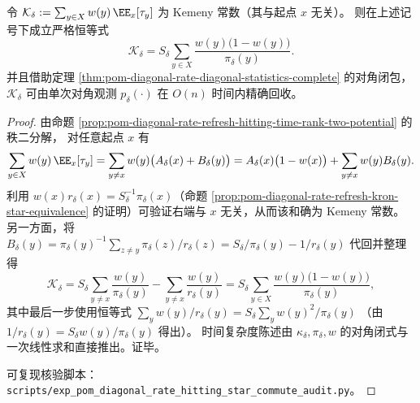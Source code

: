 \begin{theorem}\label{thm:pom-diagonal-rate-refresh-kemeny-star-closed}
令
\(
\mathcal K_\delta:=\sum_{y\in X}w(y)\,\EE_x[\tau_y]
\)
为 Kemeny 常数（其与起点 \(x\) 无关）。
则在上述记号下成立严格恒等式
\[
\mathcal K_\delta
=S_\delta\sum_{y\in X}\frac{w(y)\bigl(1-w(y)\bigr)}{\pi_\delta(y)}.
\]
并且借助定理 \ref{thm:pom-diagonal-rate-diagonal-statistics-complete} 的对角闭包，\(\mathcal K_\delta\) 可由单次对角观测 \(p_\delta(\cdot)\) 在 \(O(n)\) 时间内精确回收。
\end{theorem}
\begin{proof}
由命题 \ref{prop:pom-diagonal-rate-refresh-hitting-time-rank-two-potential} 的秩二分解，
对任意起点 \(x\) 有
\[
\sum_{y\in X}w(y)\,\EE_x[\tau_y]
=\sum_{y\ne x}w(y)\bigl(A_\delta(x)+B_\delta(y)\bigr)
=A_\delta(x)\bigl(1-w(x)\bigr)+\sum_{y\ne x}w(y)B_\delta(y).
\]
利用 \(w(x)r_\delta(x)=S_\delta^{-1}\pi_\delta(x)\)（命题 \ref{prop:pom-diagonal-rate-refresh-kron-star-equivalence} 的证明）可验证右端与 \(x\) 无关，从而该和确为 Kemeny 常数。
另一方面，将
\(
B_\delta(y)=\pi_\delta(y)^{-1}\sum_{z\ne y}\pi_\delta(z)/r_\delta(z)
=S_\delta/\pi_\delta(y)-1/r_\delta(y)
\)
代回并整理得
\[
\mathcal K_\delta
=S_\delta\sum_{y\ne x}\frac{w(y)}{\pi_\delta(y)}-\sum_{y\ne x}\frac{w(y)}{r_\delta(y)}
=S_\delta\sum_{y\in X}\frac{w(y)\bigl(1-w(y)\bigr)}{\pi_\delta(y)},
\]
其中最后一步使用恒等式
\(
\sum_y w(y)/r_\delta(y)=S_\delta\sum_y w(y)^2/\pi_\delta(y)
\)
（由 \(1/r_\delta(y)=S_\delta w(y)/\pi_\delta(y)\) 得出）。
时间复杂度陈述由 \(\kappa_\delta,\pi_\delta,w\) 的对角闭式与一次线性求和直接推出。证毕。
\par
可复现核验脚本：\texttt{scripts/exp\_pom\_diagonal\_rate\_hitting\_star\_commute\_audit.py}。
\end{proof}

